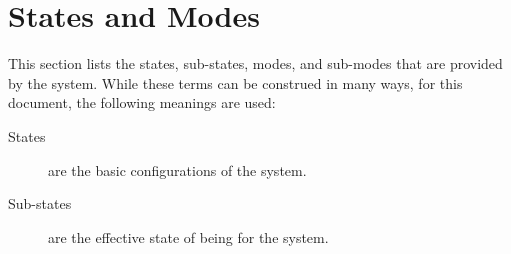 \KNEADSECTIONNEWPAGE
\section{States and Modes}
\label{loc:StatesAndModes}


This section lists the states, sub-states, modes, and sub-modes that are provided by the system.
While these terms can be construed in many ways, for this document, the following meanings are used:
\begin{description}
	\item[States] are the basic configurations of the system.
	\item[Sub-states] are the effective state of being for the system.
\end{description}

